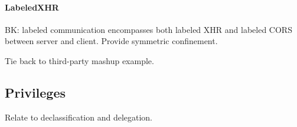 \paragraph{LabeledXHR}

BK: labeled communication encompasses both labeled XHR and labeled
CORS between server and client. Provide symmetric confinement.

Tie back to third-party mashup example.

\subsection{Privileges}
\label{sec:system:privileges}
Relate to declassification and delegation.






